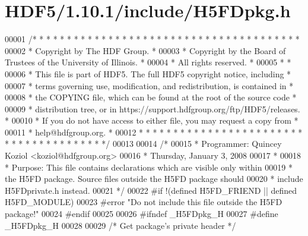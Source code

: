 \hypertarget{_h_d_f5_21_810_81_2include_2_h5_f_dpkg_8h_source}{}\section{H\+D\+F5/1.10.1/include/\+H5\+F\+Dpkg.h}
\label{_h_d_f5_21_810_81_2include_2_h5_f_dpkg_8h_source}

\begin{DoxyCode}
00001 \textcolor{comment}{/* * * * * * * * * * * * * * * * * * * * * * * * * * * * * * * * * * * * * * *}
00002 \textcolor{comment}{ * Copyright by The HDF Group.                                               *}
00003 \textcolor{comment}{ * Copyright by the Board of Trustees of the University of Illinois.         *}
00004 \textcolor{comment}{ * All rights reserved.                                                      *}
00005 \textcolor{comment}{ *                                                                           *}
00006 \textcolor{comment}{ * This file is part of HDF5.  The full HDF5 copyright notice, including     *}
00007 \textcolor{comment}{ * terms governing use, modification, and redistribution, is contained in    *}
00008 \textcolor{comment}{ * the COPYING file, which can be found at the root of the source code       *}
00009 \textcolor{comment}{ * distribution tree, or in https://support.hdfgroup.org/ftp/HDF5/releases.  *}
00010 \textcolor{comment}{ * If you do not have access to either file, you may request a copy from     *}
00011 \textcolor{comment}{ * help@hdfgroup.org.                                                        *}
00012 \textcolor{comment}{ * * * * * * * * * * * * * * * * * * * * * * * * * * * * * * * * * * * * * * */}
00013 
00014 \textcolor{comment}{/*}
00015 \textcolor{comment}{ * Programmer:  Quincey Koziol <koziol@hdfgroup.org>}
00016 \textcolor{comment}{ *      Thursday, January  3, 2008}
00017 \textcolor{comment}{ *}
00018 \textcolor{comment}{ * Purpose: This file contains declarations which are visible only within}
00019 \textcolor{comment}{ *      the H5FD package.  Source files outside the H5FD package should}
00020 \textcolor{comment}{ *      include H5FDprivate.h instead.}
00021 \textcolor{comment}{ */}
00022 \textcolor{preprocessor}{#if !(defined H5FD\_FRIEND || defined H5FD\_MODULE)}
00023 \textcolor{preprocessor}{#error "Do not include this file outside the H5FD package!"}
00024 \textcolor{preprocessor}{#endif}
00025 
00026 \textcolor{preprocessor}{#ifndef \_H5FDpkg\_H}
00027 \textcolor{preprocessor}{#define \_H5FDpkg\_H}
00028 
00029 \textcolor{comment}{/* Get package's private header */}

\end{DoxyCode}
